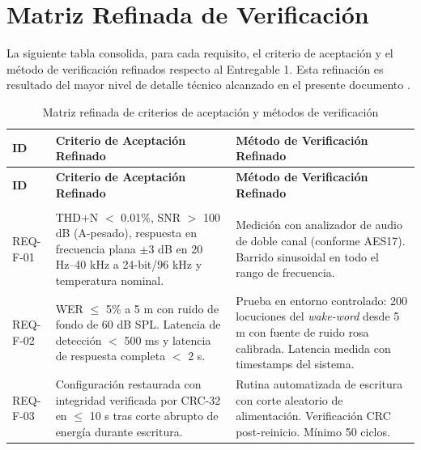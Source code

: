 \documentclass[%
	paper=a4,
	twoside=false,
	parskip=half,
	chapterprefix=false,
	10pt,
	headings=normal,
	bibliography=totoc,
	listof=totoc,
	titlepage=on,
	captions=tableabove,
	draft=false, 
]{scrbook}%
\begin{document}
\chapter{Matriz Refinada de Verificación}
\label{chap:verificacion}

La siguiente tabla consolida, para cada requisito, el criterio de aceptación y el método de verificación refinados respecto al Entregable 1. Esta refinación es resultado del mayor nivel de detalle técnico alcanzado en el presente documento \cite{guia_entregable2}.

\begingroup
\small
\renewcommand{\arraystretch}{1.4}
\begin{longtable}{|>{\raggedright\arraybackslash}p{1.6cm}|
                   >{\raggedright\arraybackslash}p{6.2cm}|
                   >{\raggedright\arraybackslash}p{6.2cm}|}
\caption{Matriz refinada de criterios de aceptación y métodos de verificación} \label{tab:verificacion} \\

\hline
\rowcolor[HTML]{EFEFEF}
\textbf{ID} & \textbf{Criterio de Aceptación Refinado} & \textbf{Método de Verificación Refinado} \\ \hline
\endfirsthead

\hline
\rowcolor[HTML]{EFEFEF}
\textbf{ID} & \textbf{Criterio de Aceptación Refinado} & \textbf{Método de Verificación Refinado} \\ \hline
\endhead

\hline \multicolumn{3}{r}{\small Continúa en la siguiente página\ldots} \\
\endfoot

\hline
\endlastfoot

REQ-F-01 &
THD+N $<$ 0.01\%, SNR $>$ 100 dB (A-pesado), respuesta en frecuencia plana $\pm$3 dB en 20 Hz–40 kHz a 24-bit/96 kHz y temperatura nominal. &
Medición con analizador de audio de doble canal (conforme AES17). Barrido sinusoidal en todo el rango de frecuencia. \\ \hline

REQ-F-02 &
WER $\leq$ 5\% a 5 m con ruido de fondo de 60 dB SPL. Latencia de detección $<$ 500 ms y latencia de respuesta completa $<$ 2 s. &
Prueba en entorno controlado: 200 locuciones del \textit{wake-word} desde 5 m con fuente de ruido rosa calibrada. Latencia medida con timestamps del sistema. \\ \hline

REQ-F-03 &
Configuración restaurada con integridad verificada por CRC-32 en $\leq$ 10 s tras corte abrupto de energía durante escritura. &
Rutina automatizada de escritura con corte aleatorio de alimentación. Verificación CRC post-reinicio. Mínimo 50 ciclos. \\ \hline


\end{longtable}
\end{document}
